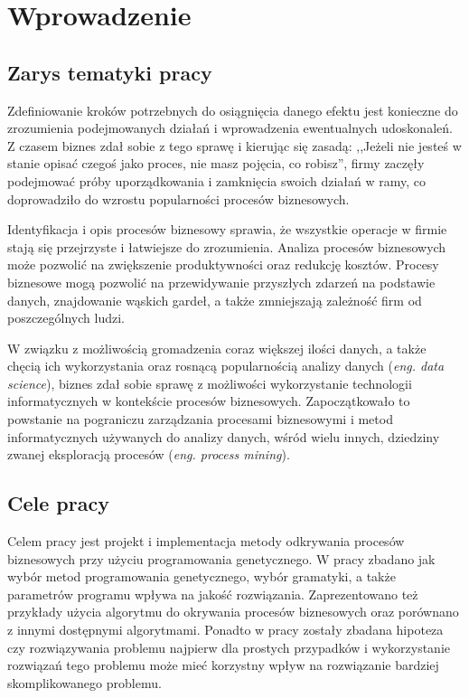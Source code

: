 \chapter{Wprowadzenie}
\label{cha:wprowadzenie}


\section{Zarys tematyki pracy}
\label{sec:zarysPracy}

Zdefiniowanie kroków potrzebnych do osiągnięcia danego efektu jest konieczne do zrozumienia podejmowanych działań i wprowadzenia ewentualnych udoskonaleń. Z czasem biznes zdał sobie z tego sprawę i kierując się zasadą: ,,Jeżeli nie jesteś w stanie opisać czegoś jako proces, nie masz pojęcia, co robisz'', firmy zaczęły podejmować próby uporządkowania i zamknięcia swoich działań w ramy, co doprowadziło do wzrostu popularności procesów biznesowych.

Identyfikacja i opis procesów biznesowy sprawia, że wszystkie operacje w firmie stają się przejrzyste i łatwiejsze do zrozumienia. Analiza procesów biznesowych może pozwolić na zwiększenie produktywności oraz redukcję kosztów. Procesy biznesowe mogą pozwolić na przewidywanie przyszłych zdarzeń na podstawie danych, znajdowanie wąskich gardeł, a także zmniejszają zależność firm od poszczególnych ludzi.

W związku z możliwością gromadzenia coraz większej ilości danych, a także chęcią ich wykorzystania oraz rosnącą popularnością analizy danych (\textit{eng. data science}), biznes zdał sobie sprawę z możliwości wykorzystanie technologii informatycznych w kontekście procesów biznesowych. Zapoczątkowało to powstanie na pograniczu zarządzania procesami biznesowymi i metod informatycznych używanych do analizy danych, wśród wielu innych, dziedziny zwanej eksploracją procesów (\textit{eng. process mining}).
 
\section{Cele pracy}
\label{sec:celePracy}

Celem pracy jest projekt i implementacja metody odkrywania procesów biznesowych przy użyciu programowania genetycznego. W pracy zbadano jak wybór metod programowania genetycznego, wybór gramatyki, a także parametrów programu wpływa na jakość rozwiązania. Zaprezentowano też przykłady użycia algorytmu do okrywania procesów biznesowych oraz porównano z innymi dostępnymi algorytmami. Ponadto w pracy zostały zbadana hipoteza czy rozwiązywania problemu najpierw dla prostych przypadków i wykorzystanie rozwiązań tego problemu może mieć korzystny wpływ na rozwiązanie bardziej skomplikowanego problemu.

